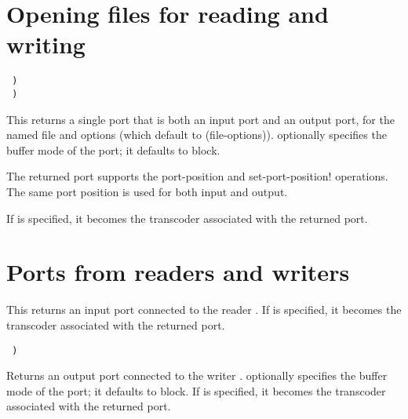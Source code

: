 \section{Opening files for reading and writing}

\begin{entry}{%
{\tt\hspace*{4em} )}\\
{\tt\hspace*{4em}  )}}
   
This returns a single port that is both an input port and an output
port, for the named file and options (which default to {\cf
  (file-options)}).   optionally specifies the buffer
mode of the port; it defaults to {\cf block}.
   
The returned port supports the {\cf port-position} and {\cf
  set-port-position!}  operations. The same port position is used for
both input and output.

If  is specified, it becomes the transcoder associated
with the returned port.
\end{entry}

\section{Ports from readers and writers}

\begin{entry}{%
}
   
This returns an input port connected to the reader .
If  is specified, it becomes the transcoder associated
with the returned port.
\end{entry}   

\begin{entry}{%
{\tt\hspace*{4em} )}}
   
Returns an output port connected to the writer .
 optionally specifies the buffer mode of the port; it
defaults to {\cf block}.
If  is specified, it becomes the transcoder associated
with the returned port.
\end{entry}

